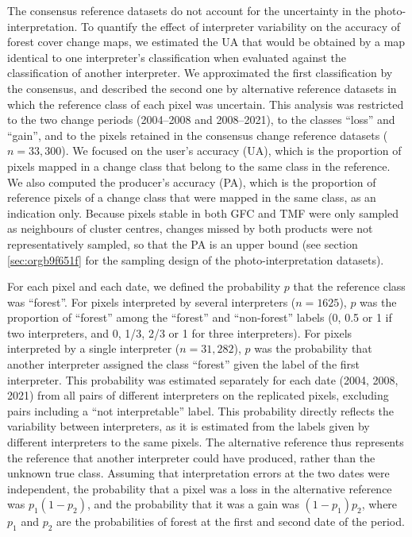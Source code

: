\documentclass[paper=a4, fontsize=12pt, DIV=13, english, dvipsnames]{scrartcl}
\begin{document}
The consensus reference datasets do not account for the uncertainty in the photo-interpretation. To quantify the effect of interpreter variability on the accuracy of forest cover change maps, we estimated the UA that would be obtained by a map identical to one interpreter's classification when evaluated against the classification of another interpreter. We approximated the first classification by the consensus, and described the second one by alternative reference datasets in which the reference class of each pixel was uncertain. This analysis was restricted to the two change periods (2004--2008 and 2008--2021), to the classes ``loss'' and ``gain'', and to the pixels retained in the consensus change reference datasets (\(n=33,300\)). We focused on the user's accuracy (UA), which is the proportion of pixels mapped in a change class that belong to the same class in the reference. We also computed the producer's accuracy (PA), which is the proportion of reference pixels of a change class that were mapped in the same class, as an indication only. Because pixels stable in both GFC and TMF were only sampled as neighbours of cluster centres, changes missed by both products were not representatively sampled, so that the PA is an upper bound (see section \ref{sec:orgb9f651f} for the sampling design of the photo-interpretation datasets).

For each pixel and each date, we defined the probability \(p\) that the reference class was ``forest''. For pixels interpreted by several interpreters (\(n=1625\)), \(p\) was the proportion of ``forest'' among the ``forest'' and ``non-forest'' labels (0, 0.5 or 1 if two interpreters, and 0, 1/3, 2/3 or 1 for three interpreters). For pixels interpreted by a single interpreter (\(n=31,282\)), \(p\) was the probability that another interpreter assigned the class ``forest'' given the label of the first interpreter. This probability was estimated separately for each date (2004, 2008, 2021) from all pairs of different interpreters on the replicated pixels, excluding pairs including a ``not interpretable'' label. This probability directly reflects the variability between interpreters, as it is estimated from the labels given by different interpreters to the same pixels. The alternative reference thus represents the reference that another interpreter could have produced, rather than the unknown true class. Assuming that interpretation errors at the two dates were independent, the probability that a pixel was a loss in the alternative reference was \(p_1 (1 - p_2)\), and the probability that it was a gain was \((1 - p_1) p_2\), where \(p_1\) and \(p_2\) are the probabilities of forest at the first and second date of the period.
\end{document}
